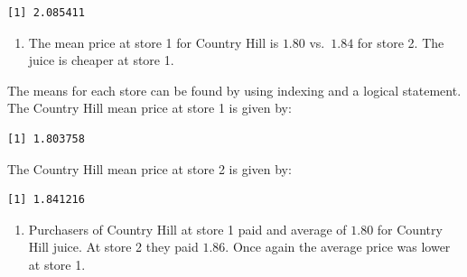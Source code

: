 \documentclass[
  letterpaper,
  DIV=11,
  numbers=noendperiod]{scrreprt}
\newenvironment{Shaded}{\begin{snugshade}}{\end{snugshade}}
\newcommand{\DecValTok}[1]{\textcolor[rgb]{0.68,0.00,0.00}{#1}}
\newcommand{\FunctionTok}[1]{\textcolor[rgb]{0.28,0.35,0.67}{#1}}
\newcommand{\NormalTok}[1]{\textcolor[rgb]{0.00,0.23,0.31}{#1}}
\newcommand{\SpecialCharTok}[1]{\textcolor[rgb]{0.37,0.37,0.37}{#1}}
\providecommand{\tightlist}{%
  \setlength{\itemsep}{0pt}\setlength{\parskip}{0pt}}\usepackage{longtable,booktabs,array}
\begin{document}
\begin{verbatim}
[1] 2.085411
\end{verbatim}

\begin{blackbox}

\begin{enumerate}
\def\labelenumi{\arabic{enumi}.}
\setcounter{enumi}{1}
\tightlist
\item
  The mean price at store 1 for Country Hill is \(1.80\) vs.~\(1.84\)
  for store 2. The juice is cheaper at store 1.
\end{enumerate}

\end{blackbox}

The means for each store can be found by using indexing and a logical
statement. The Country Hill mean price at store 1 is given by:

\begin{Shaded}
\end{Shaded}

\begin{verbatim}
[1] 1.803758
\end{verbatim}

The Country Hill mean price at store 2 is given by:

\begin{Shaded}
\end{Shaded}

\begin{verbatim}
[1] 1.841216
\end{verbatim}

\begin{blackbox}

\begin{enumerate}
\def\labelenumi{\arabic{enumi}.}
\setcounter{enumi}{2}
\tightlist
\item
  Purchasers of Country Hill at store 1 paid and average of \(1.80\) for
  Country Hill juice. At store 2 they paid \(1.86\). Once again the
  average price was lower at store 1.
\end{enumerate}

\end{blackbox}
\end{document}
